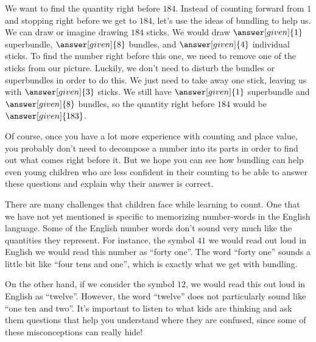 \documentclass{ximera}
\begin{document}
\begin{example}
We want to find the quantity right before $184$. Instead of counting forward from $1$ and stopping right before we get to $184$, let's use the ideas of bundling to help us. We can draw or imagine drawing $184$ sticks. We would draw $\answer[given]{1}$ superbundle, $\answer[given]{8}$ bundles, and $\answer[given]{4}$ individual sticks. To find the number right before this one, we need to remove one of the sticks from our picture. Luckily, we don't need to disturb the bundles or superbundles in order to do this. We just need to take away one stick, leaving us with $\answer[given]{3}$ sticks. We still have $\answer[given]{1}$ superbundle and $\answer[given]{8}$ bundles, so the quantity right before $184$ would be $\answer[given]{183}$.
\end{example}
Of course, once you have a lot more experience with counting and place value, you probably don't need to decompose a number into its parts in order to find out what comes right before it. But we hope you can see how bundling can help even young children who are less confident in their counting to be able to answer these questions and explain why their answer is correct.


There are many challenges that children face while learning to count. One that we have not yet mentioned is specific to memorizing number-words in the English language. Some of the English number words don't sound very much like the quantities they represent. For instance, the symbol $41$ we would read out loud in English we would read this number as ``forty one''. The word ``forty one'' sounds a little bit like ``four tens and one'', which is exactly what we get with bundling.

On the other hand, if we consider the symbol $12$, we would read this out loud in English as ``twelve''. However, the  word ``twelve'' does not particularly sound like ``one ten and two''. It's important to listen to what kids are thinking and ask them questions that help you understand where they are confused, since some of these misconceptions can really hide!
\end{document}

